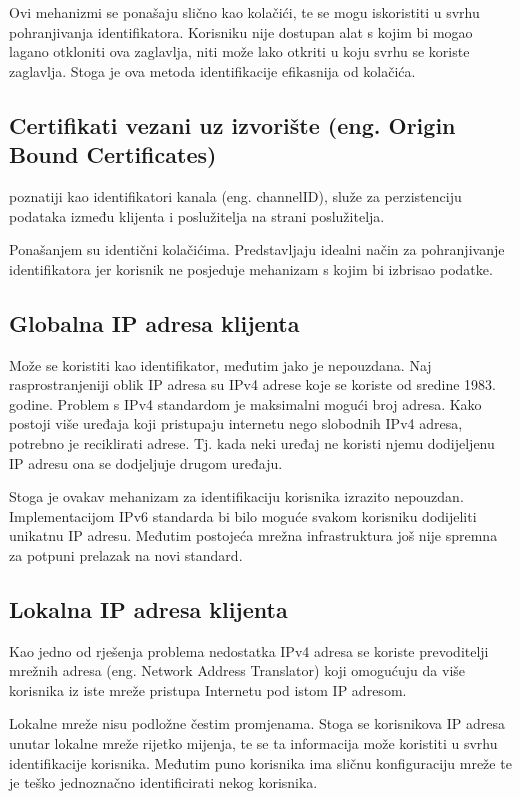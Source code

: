\documentclass[times, utf8, zavrsni]{fer}
\begin{document}
Ovi mehanizmi se ponašaju slično kao kolačići, te se mogu iskoristiti u
svrhu pohranjivanja identifikatora. Korisniku nije dostupan alat s kojim bi
mogao lagano otkloniti ova zaglavlja, niti može lako otkriti u koju svrhu se
koriste zaglavlja. Stoga je ova metoda identifikacije efikasnija od
kolačića.

\subsection{Certifikati vezani uz izvorište (eng. Origin Bound Certificates)}
poznatiji kao identifikatori kanala (eng. channelID), služe
za perzistenciju podataka između klijenta i poslužitelja na strani
poslužitelja.

Ponašanjem su identični kolačićima. Predstavljaju idealni način za
pohranjivanje identifikatora jer korisnik ne posjeduje mehanizam s kojim bi
izbrisao podatke.

\subsection{Globalna IP adresa klijenta}
Može se koristiti kao identifikator, međutim jako je nepouzdana. Naj
rasprostranjeniji oblik IP adresa su IPv4 adrese koje se koriste od sredine
1983. godine. Problem s IPv4 standardom je maksimalni mogući broj adresa. Kako
postoji više uređaja koji pristupaju internetu nego slobodnih IPv4 adresa,
potrebno je reciklirati adrese. Tj. kada neki uređaj ne koristi njemu
dodijeljenu IP adresu ona se dodjeljuje drugom uređaju.

Stoga je ovakav mehanizam za identifikaciju korisnika izrazito nepouzdan.
Implementacijom IPv6 standarda bi bilo moguće svakom korisniku dodijeliti
unikatnu IP adresu. Međutim postojeća mrežna infrastruktura još nije spremna
za potpuni prelazak na novi standard.

\subsection{Lokalna IP adresa klijenta}
Kao jedno od rješenja problema
nedostatka IPv4 adresa se koriste prevoditelji mrežnih adresa (eng.
Network Address Translator) koji omogućuju da više korisnika iz iste mreže
pristupa Internetu pod istom IP adresom. \cite{dip1981ip}

Lokalne mreže nisu podložne čestim promjenama. Stoga se korisnikova IP
adresa unutar lokalne mreže rijetko mijenja, te se ta informacija može
koristiti u svrhu identifikacije korisnika. Međutim puno korisnika ima
sličnu konfiguraciju mreže te je teško jednoznačno identificirati nekog
korisnika.
\end{document}
